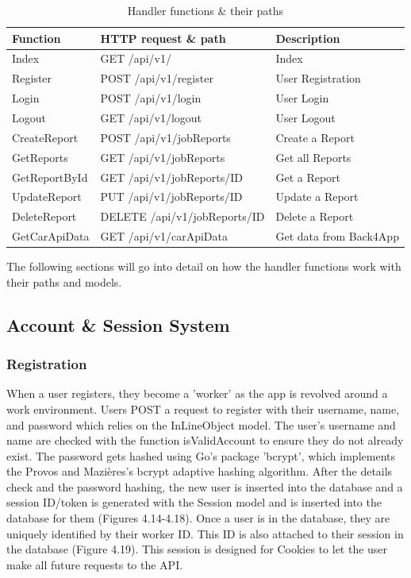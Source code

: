 \begin{table}[H]
\caption{Handler functions \& their paths}
\begin{tabular}{|l|l|l|}
\hline
Function      & HTTP request \& path         & Description            \\ \hline\hline
Index         & GET /api/v1/                 & Index                  \\ \hline
Register      & POST /api/v1/register        & User Registration      \\ \hline
Login         & POST /api/v1/login           & User Login             \\ \hline
Logout        & GET /api/v1/logout           & User Logout            \\ \hline
CreateReport  & POST /api/v1/jobReports      & Create a Report        \\ \hline
GetReports    & GET /api/v1/jobReports       & Get all Reports        \\ \hline
GetReportById & GET /api/v1/jobReports/ID    & Get a Report           \\ \hline
UpdateReport  & PUT /api/v1/jobReports/ID    & Update a Report        \\ \hline
DeleteReport  & DELETE /api/v1/jobReports/ID & Delete a Report        \\ \hline
GetCarApiData & GET /api/v1/carApiData       & Get data from Back4App \\
\hline
\end{tabular}
\end{table}

The following sections will go into detail on how the handler functions work with their paths and models.

\subsection{Account \& Session System}
\subsubsection{Registration}
When a user registers, they become a 'worker' as the app is revolved around a work environment. Users POST a request to register with their username, name, and password which relies on the InLineObject model. The user's username and name are checked with the function isValidAccount to ensure they do not already exist. The password gets hashed using Go's package 'bcrypt', which implements the Provos and Mazières's bcrypt adaptive hashing algorithm. \cite{ref25} After the details check and the password hashing, the new user is inserted into the database and a session ID/token is generated with the Session model and is inserted into the database for them (Figures 4.14-4.18). Once a user is in the database, they are uniquely identified by their worker ID. This ID is also attached to their session in the database (Figure 4.19). This session is designed for Cookies to let the user make all future requests to the API.


